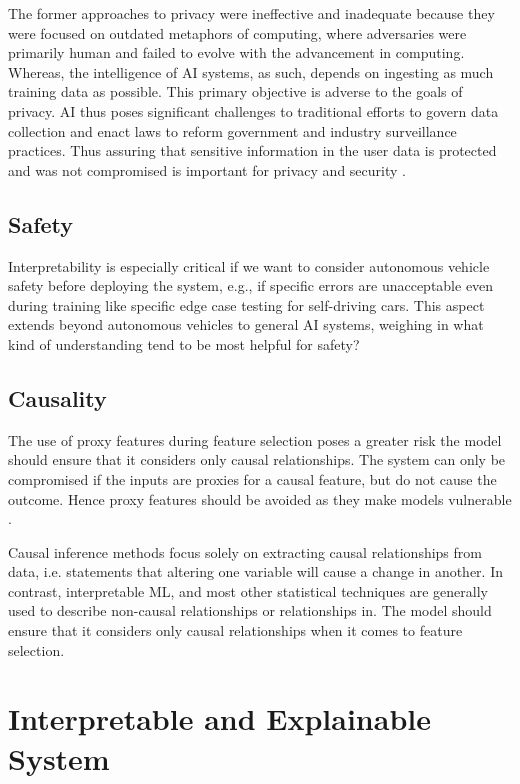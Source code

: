 The former approaches to privacy were ineffective and inadequate because they were focused on outdated metaphors of computing, where adversaries were primarily human and failed to evolve with the advancement in computing. Whereas, the intelligence of AI systems, as such, depends on ingesting as much training data as possible. This primary objective is adverse to the goals of privacy. AI thus poses significant challenges to traditional efforts to govern data collection and enact laws to reform government and industry surveillance practices. Thus assuring that sensitive information in the user data is protected and was not compromised is important for privacy and security \cite{molnar}. 

\subsection{Safety}

Interpretability is especially critical if we want to consider autonomous vehicle \cite{shannon_mattern} safety before deploying the system, e.g., if specific errors are unacceptable even during training like specific edge case testing for self-driving cars. This aspect extends beyond autonomous vehicles to general AI systems, weighing in what kind of understanding tend to be most helpful for safety?

\subsection*{Causality}

The use of proxy features during feature selection poses a greater risk the model should ensure that it considers only causal relationships. The system can only be compromised if the inputs are proxies for a causal feature, but do not cause the outcome. Hence proxy features should be avoided as they make models vulnerable \cite{molnar}.

Causal inference methods focus solely on extracting causal relationships from data, i.e. statements that altering one variable will cause a change in another. In contrast, interpretable ML, and most other statistical techniques are generally used to describe non-causal relationships or relationships in. The model should ensure that it considers only causal relationships when it comes to feature selection.

\section{Interpretable and Explainable System}

